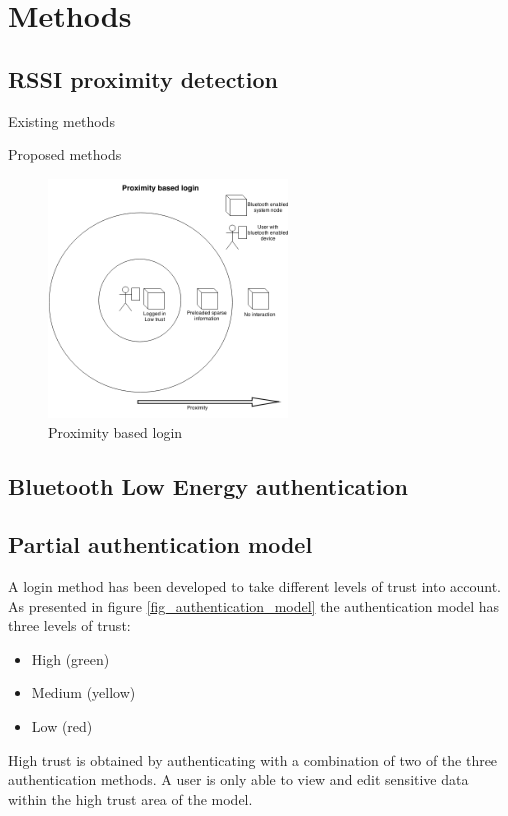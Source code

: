 \section{Methods}

\subsection{RSSI proximity detection}

Existing methods

Proposed methods

\begin{figure}[!t]
	\centering
	\includegraphics[width=2.5in]{img/proximityBasedLogin}
	\caption{ Proximity based login }
	\label{fig_proximity_based_login}
\end{figure}

\subsection{Bluetooth Low Energy authentication}

\subsection{Partial authentication model}
A login method has been developed to take different levels of trust into account.
As presented in figure \ref{fig_authentication_model} the authentication model has three levels of trust:

\begin{itemize}
\item High (green)
\item Medium (yellow)
\item Low (red)
\end{itemize}

High trust is obtained by authenticating with a combination of two of the three authentication methods.
A user is only able to view and edit sensitive data within the high trust area of the model.

